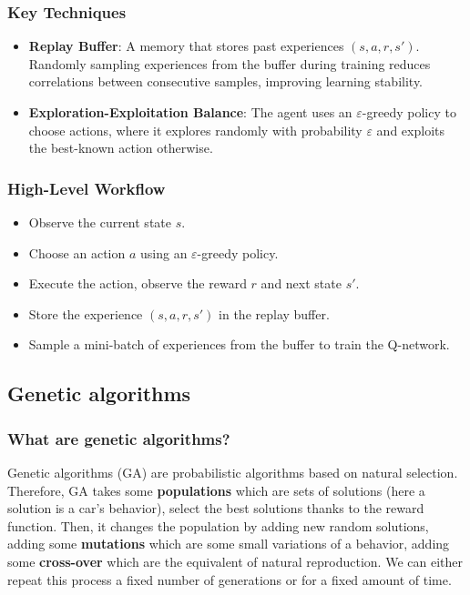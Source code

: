 \documentclass[11pt,a4paper]{article}
\newcommand{\mlist}[1]{\begin{itemize}[noitemsep,topsep=0pt]#1\end{itemize}}
\begin{document}
            \subsubsection*{Key Techniques}
\mlist{
    \item \textbf{Replay Buffer}: A memory that stores past experiences $(s, a, r, s')$. Randomly sampling experiences from the buffer during training reduces correlations between consecutive samples, improving learning stability.
    \item \textbf{Exploration-Exploitation Balance}: The agent uses an $\varepsilon$-greedy policy to choose actions, where it explores randomly with probability $\varepsilon$ and exploits the best-known action otherwise.
}
    
            \subsubsection*{High-Level Workflow}
\mlist{
\item Observe the current state $s$.
\item Choose an action $a$ using an $\varepsilon$-greedy policy.
\item Execute the action, observe the reward $r$ and next state $s'$.
\item Store the experience $(s, a, r, s')$ in the replay buffer.
\item Sample a mini-batch of experiences from the buffer to train the Q-network.
}
    


	
		\subsection*{Genetic algorithms}
			\subsubsection*{What are genetic algorithms?}
Genetic algorithms (GA) are probabilistic algorithms based on natural selection. Therefore, GA takes some \textbf{populations} which are sets of solutions (here a solution is a car's behavior), select the best solutions thanks to the reward function. Then, it changes the population by adding new random solutions, adding some \textbf{mutations} which are some small variations of a behavior, adding some \textbf{cross-over} which are the equivalent of natural reproduction. We can either repeat this process a fixed number of generations or for a fixed amount of time.
		
\end{document}
